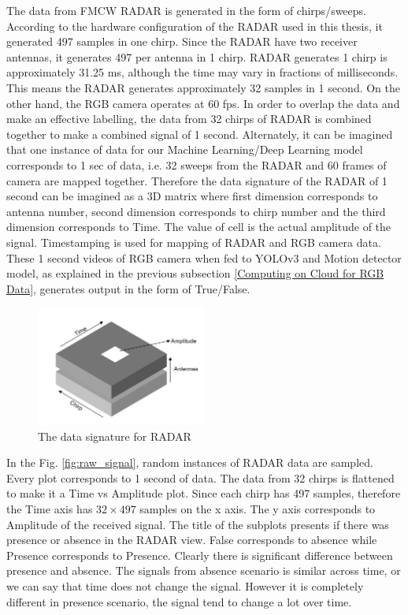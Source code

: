 The data from FMCW RADAR is generated in the form of chirps/sweeps. According to the hardware configuration of the RADAR used in this thesis, it generated 497 samples in one chirp. Since the RADAR have two receiver antennas, it generates 497 per antenna in 1 chirp. RADAR generates 1 chirp is approximately 31.25 ms, although the time may vary in fractions of milliseconds. This means the RADAR generates approximately 32 samples in 1 second. On the other hand, the RGB camera operates at 60 fps. In order to overlap the data and make an effective labelling, the data from 32 chirps of RADAR is combined together to make a combined signal of 1 second. Alternately, it can be imagined that one instance of data for our Machine Learning/Deep Learning model corresponds to 1 sec of data, i.e. 32 sweeps from the RADAR and 60 frames of camera are mapped together. Therefore the data signature of the RADAR of 1 second can be imagined as a 3D matrix where first dimension corresponds to antenna number, second dimension corresponds to chirp number and the third dimension corresponds to Time. The value of cell is the actual amplitude of the signal. Timestamping is used for mapping of RADAR and RGB camera data. These 1 second videos of RGB camera when fed to YOLOv3 and Motion detector model, as explained in the previous subsection \ref{Computing on Cloud for RGB Data}, generates output in the form of True/False. 
\begin{figure}[ht]
  \begin{center}
    \includegraphics[width=0.5\textwidth]{Master's thesis/images/signature.PNG} 
    \caption{The data signature for RADAR}
    \label{fig:signature}
  \end{center}
\end{figure}  



In the Fig. \ref{fig:raw_signal}, random instances of RADAR data are sampled. Every plot corresponds to 1 second of data. The data from 32 chirps is flattened to make it a Time vs Amplitude plot. Since each chirp has 497 samples, therefore the Time axis has $32\times497$ samples on the x axis. The y axis corresponds to Amplitude of the received signal. The title of the subplots presents if there was presence or absence in the RADAR view. False corresponds to absence while Presence corresponds to Presence. Clearly there is significant difference between presence and absence. The signals from absence scenario is similar across time, or we can say that time does not change the signal. However it is completely different in presence scenario, the signal tend to change a lot over time.

